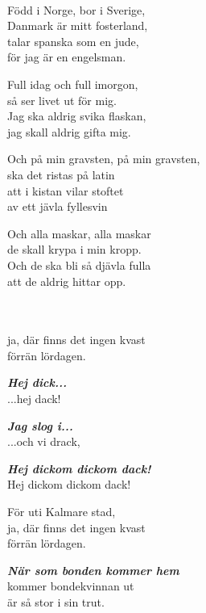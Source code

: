{{\newpage

 \\       

\songtext{}
Född i Norge, bor i Sverige,\\
Danmark är mitt fosterland,\\
talar spanska som en jude,\\
för jag är en engelsman.

Full idag och full imorgon,\\
så ser livet ut för mig.\\
Jag ska aldrig svika flaskan,\\
jag skall aldrig gifta mig.

Och på min gravsten, på min gravsten,\\
ska det ristas på latin\\
att i kistan vilar stoftet\\
av ett jävla fyllesvin

Och alla maskar, alla maskar\\
de skall krypa i min kropp.\\
Och de ska bli så djävla fulla\\
att de aldrig hittar opp.

\newpage


\vspace{0.15cm}
\melochtext{}\\
\\
ja, där finns det ingen kvast\\
förrän lördagen.

\textbf{\textit{Hej dick...}}\\
...hej dack!

\textbf{\textit{Jag slog i...}}\\
...och vi drack,

\textbf{\textit{Hej dickom dickom dack!}}\\
Hej dickom dickom dack!

För uti Kalmare stad, \\
ja, där finns det ingen kvast\\
förrän lördagen.

\leftrepeat \textbf{\textit{När som bonden kommer hem}}\\
kommer bondekvinnan ut \rightrepeat\\
är så stor i sin trut.

}}
